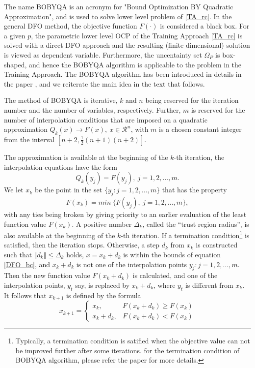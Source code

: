 	The name BOBYQA is an acronym for "Bound Optimization BY Quadratic Approximation", and is used to solve lower level problem of \ref{TA_rc}. In the general DFO method, the objective function $F(\cdot)$ is considered a black box. For a given $p$, the parametric lower level OCP of the Training Approach \ref{TA_rc} is solved with a direct DFO approach and the resulting (finite dimensional) solution is viewed as dependent variable. Furthermore, the uncentainty set $\Omega_P$ is box-shaped, and hence the BOBYQA algorithm is applicable to the problem in the Training Approach. The BOBYQA algorithm has been introduced in details in the paper \cite{MicPow09}, and we reiterate the main idea in the text that follows.  
	
	The method of BOBYQA is iterative, $k$ and $n$ being reserved for the iteration number and the number of variables, respectively. Further, $m$ is reserved for the number of interpolation conditions that are imposed on a quadratic approximation $Q_k(x) \xrightarrow{} F(x), \ x \in  \mathcal{R}^n$, with $m$ is a chosen constant  integer from the interval $[n+2, \frac{1}{2}(n+1)(n+2)]$. 
	
	The approximation is available at the beginning of the $k$-th iteration, the interpolation equations have the form
	\begin{equation}
		Q_k(y_j)= F(y_j),\   j = 1, 2, ..., m.
	\end{equation}
	We let $x_k$ be the point in the set $\{y_j : j = 1, 2, ... , m\}$ that has the property
	\begin{equation}
		F(x_k)= min\ \{F(y_j), \  j = 1, 2, ..., m\}, 
	\end{equation}
	with any ties being broken by giving priority to an earlier evaluation of the least function value $F(x_k)$. A positive number $\Delta_k$, called the “trust region radius”, is also available at the beginning of the $k$-th iteration. If a termination condition\footnote{Typically, a termination condition is satified when the objective value can not be improved further after some iterations. for the termination condition of BOBYQA algorithm, please refer the paper \cite{MicPow09} for more details.} is satisfied, then the iteration stops. Otherwise, a step $d_k$ from $x_k$ is constructed such that $ \Vert d_k \Vert \leq \Delta_k $ holds, $x = x_k+d_k$ is within the bounds of equation \ref{DFO_bc}, and $x_k+d_k$ is not one of the interpolation points $y_j : j = 1, 2, ... , m$. Then the new function value $F(x_k+d_k)$ is calculated, and one of the interpolation points, $y_t$ say, is replaced by $x_k+d_k$, where $y_t$ is different from $x_k$. It follows that $x_{k+1}$ is defined by the formula
	\begin{equation}
		x_{k+1} =
		\begin{cases}
			x_k, & F(x_k+d_k) \geq F(x_k) \\
			x_k+d_k  , & F(x_k+d_k) < F(x_k) 
		\end{cases}
	\end{equation}
	

